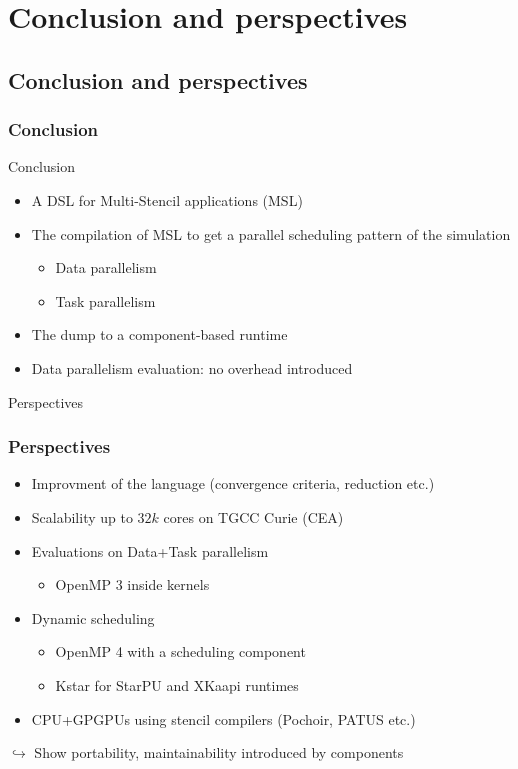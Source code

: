 \documentclass{beamer}
\begin{document}
\section{Conclusion and perspectives}
\subsection{Conclusion and perspectives}
\begin{frame}
\frametitle{Conclusion}
\begin{block}{Conclusion}
\begin{itemize}
\item A DSL for Multi-Stencil applications (MSL)
\item The compilation of MSL to get a parallel scheduling pattern of the simulation
\begin{itemize}
\item Data parallelism
\item Task parallelism
\end{itemize}
\item The dump to a component-based runtime
\item Data parallelism evaluation: no overhead introduced 
\end{itemize}
\end{block}
\end{frame}

\begin{frame}
\begin{block}{Perspectives}
\frametitle{Perspectives}
\begin{itemize}
\item Improvment of the language (convergence criteria, reduction etc.)
\item Scalability up to $32k$ cores on TGCC Curie (CEA)
\item Evaluations on Data+Task parallelism
\begin{itemize}
\item OpenMP 3 inside kernels
\end{itemize}
\item Dynamic scheduling
\begin{itemize}
\item OpenMP 4 with a scheduling component
\item Kstar for StarPU and XKaapi runtimes
\end{itemize}
\item CPU+GPGPUs using stencil compilers (Pochoir, PATUS etc.)
\end{itemize}
$\hookrightarrow$ Show portability, maintainability introduced by components
\end{block}
\end{frame}
\end{document}

